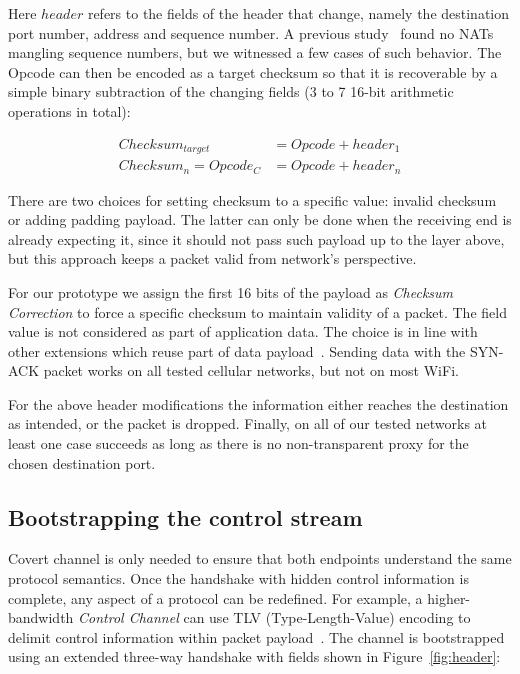 \documentclass{sig-alternate-10pt}
\begin{document}
Here $header$ refers to the fields of the header that change, namely the destination port number, address and sequence number. A previous study~\cite{UntoldMiddlebox2011} found no NATs mangling sequence numbers, but we witnessed a few cases of such behavior. The Opcode can then be encoded as a target checksum so that it is recoverable by a simple binary subtraction of the changing fields (3 to 7 16-bit arithmetic operations in total):

\begin{align*}
Checksum_{target} & = Opcode + header_1 \\
Checksum_n = Opcode_C & = Opcode + header_n
\end{align*}

There are two choices for setting checksum to a specific value: invalid checksum or adding padding payload. The latter can only be done when the receiving end is already expecting it, since it should not pass such payload up to the layer above, but this approach keeps a packet valid from network's perspective.

For our prototype we assign the first 16 bits of the payload as \emph{Checksum Correction} to force a specific checksum to maintain validity of a packet. The field value is not considered as part of application data. The choice is in line with other extensions which reuse part of data payload~\cite{Mazieres:uz,Bonaventure:wx}. Sending data with the SYN-ACK packet works on all tested cellular networks, but not on most WiFi.

For the above header modifications the information either reaches the destination as intended, or the packet is dropped. Finally, on all of our tested networks at least one case succeeds as long as there is no non-transparent proxy for the chosen destination port.

\subsection{Bootstrapping the control stream}

Covert channel is only needed to ensure that both endpoints understand the same protocol semantics. Once the handshake with hidden control information is complete, any aspect of a protocol can be redefined. For example, a higher-bandwidth \emph{Control Channel} can use TLV (Type-Length-Value) encoding to delimit control information within packet payload~\cite{Bonaventure:wx}. The channel is bootstrapped using an extended three-way handshake with fields shown in Figure~\ref{fig:header}:
\end{document}
